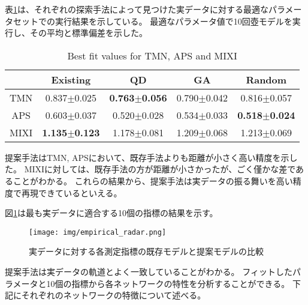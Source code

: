 \documentclass[uplatex,11pt,openany]{ujreport}
\begin{document}
            表\ref{tab:best_distance}は、それぞれの探索手法によって見つけた実データに対する最適なパラメータセットでの実行結果を示している。
            最適なパラメータ値で10回壺モデルを実行し、その平均と標準偏差を示した。
            \begin{table}[H]
                \centering
                \caption{Best fit values for TMN, APS and MIXI}
                \label{tab:best_distance}
                \begin{tabular}{ccccc}
                \hline
                     & Existing & QD & GA & Random \\ \hline
                TMN  & 0.837$\pm$0.025     & \textbf{0.763$\pm$0.056}       & 0.790$\pm$0.042       & 0.816$\pm$0.057   \\
                APS  & 0.603$\pm$0.037     & 0.520$\pm$0.028       & 0.534$\pm$0.033       & \textbf{0.518$\pm$0.024}   \\
                MIXI & \textbf{1.135$\pm$0.123}     & 1.178$\pm$0.081       & 1.209$\pm$0.068       & 1.213$\pm$0.069   \\ \hline
                \end{tabular}
            \end{table}
            提案手法はTMN, APSにおいて、既存手法よりも距離が小さく高い精度を示した。
            MIXIに対しては、既存手法の方が距離が小さかったが、ごく僅かな差であることがわかる。
            これらの結果から、提案手法は実データの振る舞いを高い精度で再現できているといえる。

            図\ref{fig:radar_chart}は最も実データに適合する10個の指標の結果を示す。
            \begin{figure}[H]
                \centering
                \texttt{[image: img/empirical\_radar.png]}
                \caption{実データに対する各測定指標の既存モデルと提案モデルの比較}
                \label{fig:radar_chart}
            \end{figure}
            提案手法は実データの軌道とよく一致していることがわかる。
            フィットしたパラメータと10個の指標から各ネットワークの特性を分析することができる。
            下記にそれぞれのネットワークの特徴について述べる。
\end{document}
